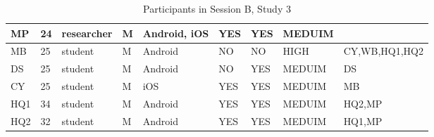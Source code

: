 \begin{table}[H]
{\begin{tabular}{|l|l|l|l|l|l|l|l|l|}
MP       & 24  & researcher & M          & Android, iOS                                                   & YES                                                                & YES                                                                 & MEDUIM                                                      &                                                                   \\ \hline
MB       & 25  & student    & M          & Android                                                        & NO                                                                 & NO                                                                  & HIGH                                                        & CY,WB,HQ1,HQ2                                                     \\ \hline
DS       & 25  & student    & M          & Android                                                        & NO                                                                 & YES                                                                 & MEDUIM                                                      & DS                                                                \\ \hline
CY       & 25  & student    & M          & iOS                                                            & YES                                                                & YES                                                                 & MEDUIM                                                      & MB                                                                \\ \hline
HQ1      & 34  & student    & M          & Android                                                        & YES                                                                & YES                                                                 & MEDUIM                                                      & HQ2,MP                                                            \\ \hline
HQ2      & 32  & student    & M          & Android                                                        & YES                                                                & YES                                                                 & MEDUIM                                                      & HQ1,MP                                                            \\ \hline
\end{tabular}}
\caption{Participants in Session B, Study 3}
\end{table}

